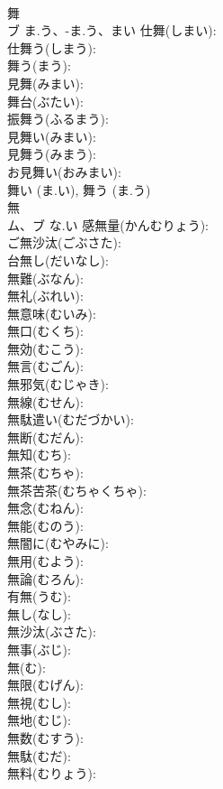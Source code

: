 \documentclass[8pt]{extreport}
\begin{document}
\begin{CJK}{UTF8}{min}
\\	舞			
\\	ブ	ま.う、-ま.う、まい	仕舞(しまい): 
\\	仕舞う(しまう): 
\\	舞う(まう): 
\\	見舞(みまい): 
\\	舞台(ぶたい): 
\\	振舞う(ふるまう): 
\\	見舞い(みまい): 
\\	見舞う(みまう): 
\\	お見舞い(おみまい): 
\\	舞い (ま.い), 舞う (ま.う)
\\	無			
\\	ム、ブ	な.い	感無量(かんむりょう): 
\\	ご無沙汰(ごぶさた): 
\\	台無し(だいなし): 
\\	無難(ぶなん): 
\\	無礼(ぶれい): 
\\	無意味(むいみ): 
\\	無口(むくち): 
\\	無効(むこう): 
\\	無言(むごん): 
\\	無邪気(むじゃき): 
\\	無線(むせん): 
\\	無駄遣い(むだづかい): 
\\	無断(むだん): 
\\	無知(むち): 
\\	無茶(むちゃ): 
\\	無茶苦茶(むちゃくちゃ): 
\\	無念(むねん): 
\\	無能(むのう): 
\\	無闇に(むやみに): 
\\	無用(むよう): 
\\	無論(むろん): 
\\	有無(うむ): 
\\	無し(なし): 
\\	無沙汰(ぶさた): 
\\	無事(ぶじ): 
\\	無(む): 
\\	無限(むげん): 
\\	無視(むし): 
\\	無地(むじ): 
\\	無数(むすう): 
\\	無駄(むだ): 
\\	無料(むりょう): 

\end{CJK}
\end{document}

